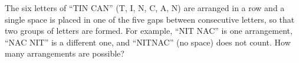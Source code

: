 The six letters of ``TIN CAN'' (T, I, N, C, A, N) are arranged in a row and a single space is placed in one of the five gaps between consecutive letters, so that two groups of letters are formed. For example, ``NIT NAC'' is one arrangement, ``NAC NIT'' is a different one, and ``NITNAC'' (no space) does not count. How many arrangements are possible?
